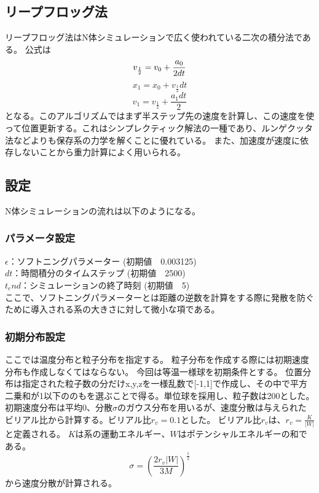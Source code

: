 \documentclass{jsarticle}
\begin{document}
\subsection {リープフロッグ法}
リープフロッグ法はN体シミュレーションで広く使われている二次の積分法である。
公式は
\begin {equation}
    v_{\frac{1}{2}} = v_0 + \frac{a_0}{2dt}\\
\end {equation}
\begin {equation}
    x_1 = x_0 +v_{\frac{1}{2}}dt 
\end {equation}
\begin {equation}
    v_1 = v_{\frac{1}{2}} + \frac{a_1dt}{2}
\end {equation}
となる。このアルゴリズムではまず半ステップ先の速度を計算し、この速度を使って位置更新する。これはシンプレクティック解法の一種であり、ルンゲクッタ法などよりも保存系の力学を解くことに優れている。
また、加速度が速度に依存しないことから重力計算によく用いられる。
\subsection {設定}
N体シミュレーションの流れは以下のようになる。
\subsubsection{パラメータ設定}
$\epsilon$：ソフトニングパラメーター (初期値　0.003125)\\
$dt$：時間積分のタイムステップ (初期値　2500)\\
$t_end$：シミュレーションの終了時刻 (初期値　5)\\
ここで、ソフトニングパラメーターとは距離の逆数を計算をする際に発散を防ぐために導入される系の大きさに対して微小な項である。

\subsubsection{初期分布設定} 
ここでは温度分布と粒子分布を指定する。
粒子分布を作成する際には初期速度分布も作成しなくてはならない。
今回は等温一様球を初期条件とする。
位置分布は指定された粒子数の分だけx,y,zを一様乱数で[-1,1]で作成し、その中で平方二乗和が1以下ののもを選ぶことで得る。単位球を採用し、粒子数は200とした。
初期速度分布は平均0、分散$\sigma$のガウス分布を用いるが、速度分散は与えられたビリアル比から計算する。ビリアル比$r_v=0.1$とした。
ビリアル比$r_v$は、$r_v = \frac{K}{|W|}$と定義される。
$K$は系の運動エネルギー、$W$はポテンシャルエネルギーの和である。
\begin{equation}
    \sigma = (\frac{2r_v|W|}{3M})^{\frac{1}{2}}
\end{equation}
から速度分散が計算される。
\end{document}
